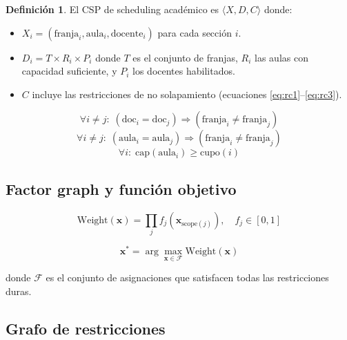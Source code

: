 \documentclass[12pt,twoside]{report}
\theoremstyle{definition}
\newtheorem{definition}{Definici\'on}[chapter]
\begin{document}
\begin{definition}
El CSP de scheduling acad\'emico es $\langle X, D, C \rangle$ donde:
\begin{itemize}
  \item $X_i = (\text{franja}_i, \text{aula}_i, \text{docente}_i)$ para cada secci\'on $i$.
  \item $D_i = T \times R_i \times P_i$ donde $T$ es el conjunto de franjas,
    $R_i$ las aulas con capacidad suficiente, y $P_i$ los docentes habilitados.
  \item $C$ incluye las restricciones de no solapamiento (ecuaciones
    \ref{eq:rc1}--\ref{eq:rc3}).
\end{itemize}
\end{definition}

\begin{equation}
  \forall i \neq j:\; (\text{doc}_i = \text{doc}_j) \Rightarrow (\text{franja}_i \neq \text{franja}_j)
  \label{eq:rc1}
\end{equation}
\begin{equation}
  \forall i \neq j:\; (\text{aula}_i = \text{aula}_j) \Rightarrow (\text{franja}_i \neq \text{franja}_j)
  \label{eq:rc2}
\end{equation}
\begin{equation}
  \forall i:\; \text{cap}(\text{aula}_i) \geq \text{cupo}(i)
  \label{eq:rc3}
\end{equation}

\subsection{Factor graph y funci\'on objetivo}

\begin{equation}
  \text{Weight}(\mathbf{x}) = \prod_{j} f_j(\mathbf{x}_{\text{scope}(j)}), \quad f_j \in [0,1]
  \label{eq:weight}
\end{equation}

\begin{equation}
  \mathbf{x}^* = \arg\max_{\mathbf{x} \in \mathcal{F}} \text{Weight}(\mathbf{x})
  \label{eq:obj_csp}
\end{equation}

donde $\mathcal{F}$ es el conjunto de asignaciones que satisfacen todas las restricciones duras.

\subsection{Grafo de restricciones}
\end{document}
